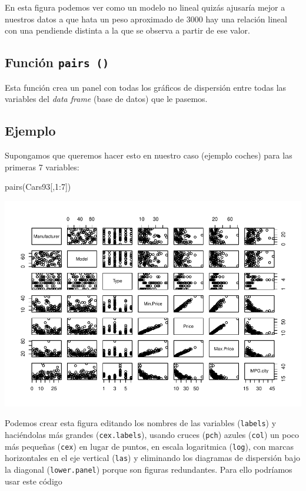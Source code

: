 \documentclass[
]{book}
\newenvironment{Shaded}{\begin{snugshade}}{\end{snugshade}}
\newcommand{\DecValTok}[1]{\textcolor[rgb]{0.00,0.00,0.81}{#1}}
\newcommand{\FunctionTok}[1]{\textcolor[rgb]{0.00,0.00,0.00}{#1}}
\newcommand{\NormalTok}[1]{#1}
\newcommand{\SpecialCharTok}[1]{\textcolor[rgb]{0.00,0.00,0.00}{#1}}
\begin{document}
En esta figura podemos ver como un modelo no lineal quizás ajusaría mejor a nuestros datos a que hata un peso aproximado de 3000 hay una relación lineal con una pendiende distinta a la que se observa a partir de ese valor.

\hypertarget{funciuxf3n-pairs}{%
\subsection{\texorpdfstring{Función \texttt{pairs\ ()}}{Función pairs ()}}\label{funciuxf3n-pairs}}

Esta función crea un panel con todas los gráficos de dispersión entre todas las variables del \emph{data frame} (base de datos) que le pasemos.

\hypertarget{ejemplo-9}{%
\subsection*{Ejemplo}\label{ejemplo-9}}

Supongamos que queremos hacer esto en nuestro caso (ejemplo coches) para las primeras 7 variables:

\begin{Shaded}
\begin{Highlighting}[]
\FunctionTok{pairs}\NormalTok{(Cars93[,}\DecValTok{1}\SpecialCharTok{:}\DecValTok{7}\NormalTok{])}
\end{Highlighting}
\end{Shaded}

\includegraphics{fig/unnamed-chunk-97-1.pdf}

Podemos crear esta figura editando los nombres de las variables (\texttt{labels}) y haciéndolas más grandes (\texttt{cex.labels}), usando cruces (\texttt{pch}) azules (\texttt{col}) un poco más pequeñas (\texttt{cex}) en lugar de puntos, en escala logaritmica (\texttt{log}), con marcas horizontales en el eje vertical (\texttt{las}) y eliminando los diagramas de dispersión bajo la diagonal (\texttt{lower.panel}) porque son figuras redundantes. Para ello podríamos usar este código
\end{document}
